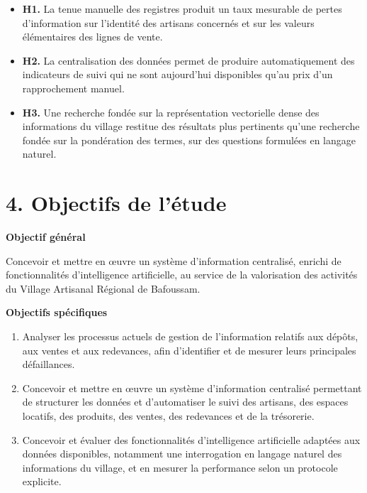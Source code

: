 \begin{itemize}[leftmargin=1.6em,itemsep=0.3em]
\item \textbf{H1.} La tenue manuelle des registres produit un taux mesurable de pertes d'information sur l'identité des artisans concernés et sur les valeurs élémentaires des lignes de vente.
\item \textbf{H2.} La centralisation des données permet de produire automatiquement des indicateurs de suivi qui ne sont aujourd'hui disponibles qu'au prix d'un rapprochement manuel.
\item \textbf{H3.} Une recherche fondée sur la représentation vectorielle dense des informations du village restitue des résultats plus pertinents qu'une recherche fondée sur la pondération des termes, sur des questions formulées en langage naturel.
\end{itemize}

\section*{4. Objectifs de l'étude}

\noindent\textbf{Objectif général}

Concevoir et mettre en œuvre un système d'information centralisé, enrichi de fonctionnalités d'intelligence artificielle, au service de la valorisation des activités du Village Artisanal Régional de Bafoussam.

\noindent\textbf{Objectifs spécifiques}

\begin{enumerate}[label=\alph*),leftmargin=1.6em,itemsep=0.3em]
\item Analyser les processus actuels de gestion de l'information relatifs aux dépôts, aux ventes et aux redevances, afin d'identifier et de mesurer leurs principales défaillances.
\item Concevoir et mettre en œuvre un système d'information centralisé permettant de structurer les données et d'automatiser le suivi des artisans, des espaces locatifs, des produits, des ventes, des redevances et de la trésorerie.
\item Concevoir et évaluer des fonctionnalités d'intelligence artificielle adaptées aux données disponibles, notamment une interrogation en langage naturel des informations du village, et en mesurer la performance selon un protocole explicite.
\end{enumerate}

